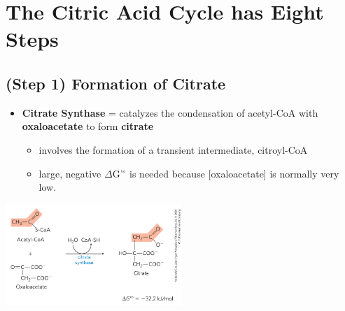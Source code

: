 \documentclass[10pt]{article}
\begin{document}
\section*{The Citric Acid Cycle has Eight Steps}
\subsection*{(Step 1) Formation of Citrate}
\begin{itemize}
	\item \textbf{Citrate Synthase} = catalyzes the condensation of acetyl-CoA with \textbf{oxaloacetate} to form \textbf{citrate}
	\begin{itemize}
        \item involves the formation of a transient intermediate, citroyl-CoA
        \item large, negative $\Delta$G'$^\circ$ is needed because [oxaloacetate] is normally very low.
    \end{itemize}
\end{itemize}
\begin{center} 
	\includegraphics*[width=0.5\textwidth]{L4_1.png}
\end{center}
\end{document}
